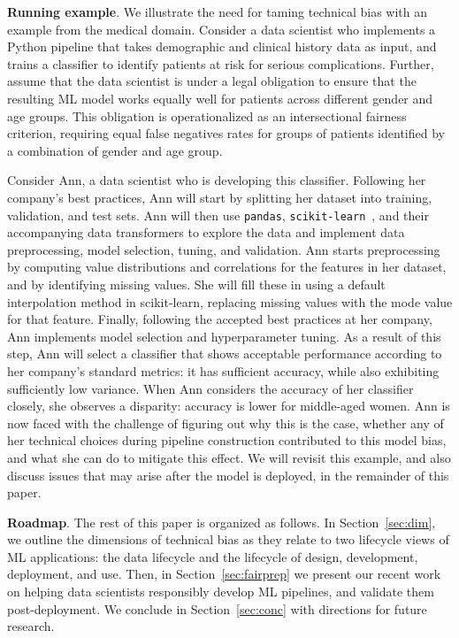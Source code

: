 \documentclass[11pt]{article}
\newcommand{\sklearn}{\stt{scikit-learn}\xspace}
\newcommand{\pandas}{\stt{pandas}\xspace}
\newcommand{\header}[1]{\vspace{1mm}\noindent\textbf{#1}.}
\newcommand{\stt}[1]{{\footnotesize\texttt{#1}}}
\begin{document}
\header{Running example} We illustrate the need for taming technical bias with an example from the medical domain. Consider a data scientist who implements a Python pipeline that takes demographic and clinical history data as input, and trains a classifier to identify patients at risk for serious complications. Further, assume that the data scientist is under a legal obligation to ensure that the resulting ML model works equally well for patients across different gender and age groups.  This obligation is operationalized as an intersectional fairness criterion, requiring equal false negatives rates for groups of patients identified by a combination of gender and age group. 

Consider Ann, a data scientist who is developing this classifier. Following her company's best practices, Ann will start by splitting her dataset into training, validation, and test sets. Ann will then use \pandas, \sklearn~\cite{Pedregosa2011}, and their accompanying data transformers to explore the data and implement data preprocessing, model selection, tuning, and validation. Ann starts preprocessing by computing value distributions and correlations for the features in her dataset, and by identifying missing values. She will fill these in using a default interpolation method in scikit-learn, replacing missing values with the mode value for that feature.  Finally, following the accepted best practices at her company, Ann implements model selection and hyperparameter tuning. As a result of this step, Ann will select a classifier that shows acceptable performance according to her company's standard metrics: it has sufficient accuracy, while also exhibiting sufficiently low variance. 
When Ann considers the accuracy of her classifier closely, she observes a disparity: accuracy is lower for middle-aged women. Ann is now faced with the challenge of figuring out why this is the case, whether any of her technical choices during pipeline construction contributed to this model bias, and what she can do to mitigate this effect. We will revisit this example, and also discuss issues that may arise after the model is deployed, in the remainder of this paper.

\header{Roadmap} The rest of this paper is organized as follows.  In Section~\ref{sec:dim}, we
outline the dimensions of technical bias as they relate to two lifecycle views of ML applications: the data lifecycle and the lifecycle of design, development, deployment, and use.  Then, in Section~\ref{sec:fairprep} we present our recent work on helping data scientists responsibly develop ML pipelines, and validate them post-deployment.  We conclude in Section~\ref{sec:conc} with directions for future research.
\end{document}
